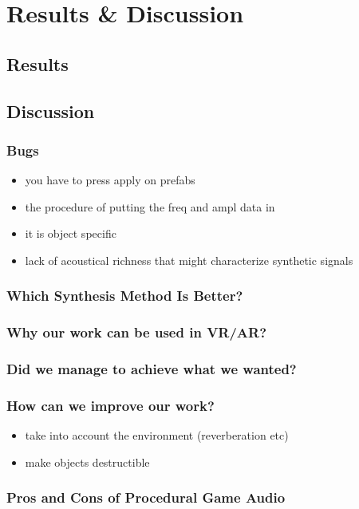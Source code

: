 \chapter{Results \& Discussion}\label{ch:results}

\section{Results}

\section{Discussion}
\subsection{Bugs}
\begin{itemize}
\item you have to press apply on prefabs
\item the procedure of putting the freq and ampl data in
\item it is object specific
\item lack of acoustical richness that might characterize synthetic signals \cite{giordano2006material}
\end{itemize}
\subsection{Which Synthesis Method Is Better?}

\subsection{Why our work can be used in VR/AR?}

\subsection{Did we manage to achieve what we wanted?}

\subsection{How can we improve our work?}
\begin{itemize}
\item take into account the environment (reverberation etc)
\item make objects destructible
\end{itemize}

\subsection{Pros and Cons of Procedural Game Audio}